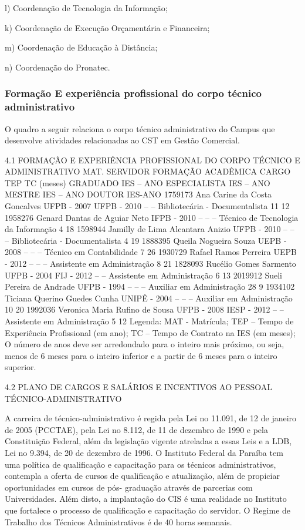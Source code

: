 l)      Coordena\c{c}\~ao de Tecnologia da Informa\c{c}\~ao;

k)      Coordena\c{c}\~ao de Execu\c{c}\~ao Or\c{c}ament\'aria e Financeira;

m)      Coordena\c{c}\~ao de Educa\c{c}\~ao \`a Dist\^ancia;

n)      Coordena\c{c}\~ao do Pronatec.


\subsubsection{Forma\c{c}\~ao E experi\^encia profissional do corpo t\'ecnico administrativo}

	



O quadro a seguir relaciona o corpo técnico administrativo do Campus que desenvolve atividades relacionadas ao CST em Gestão Comercial.
 

4.1 FORMAÇÃO E EXPERIÊNCIA PROFISSIONAL DO CORPO TÉCNICO E ADMINISTRATIVO
MAT.	SERVIDOR	FORMAÇÃO ACADÊMICA	CARGO	TEP	TC
(meses)
		GRADUADO
IES – ANO	ESPECIALISTA
IES – ANO	MESTRE
IES – ANO	DOUTOR
IES-ANO			
1759173	Ana Carine da Costa Goncalves	UFPB - 2007	UFPB - 2010	--	--	Bibliotecária - Documentalista	11	12
1958276	Genard Dantas de Aguiar Neto	IFPB - 2010	--	--	--	Técnico de Tecnologia da Informação	4	18
1598944	Jamilly de Lima Alcantara Anizio	UFPB - 2010	--	--	--	Bibliotecária - Documentalista	4	19
1888395	Queila Nogueira Souza	UEPB - 2008	--	--	--	Técnico em Contabilidade	7	26
1930729	Rafael Ramos Perreira	UEPB - 2012	--	--	--	Assistente em Administração	8	21
1828093	Rucélio Gomes Sarmento	UFPB - 2004	FIJ - 2012	--	--	Assistente em Administração	6	13
2019912	Sueli Pereira de Andrade	UFPB - 1994	--	--	--	Auxiliar em Administração	28	9
1934102	Ticiana Querino Guedes Cunha	UNIPÊ - 2004	--	--	--	Auxiliar em Administração	10	20
1992036	Veronica Maria Rufino de Sousa	UFPB - 2008	IESP - 2012	--	--	Assistente em Administração	5	12
Legenda:
MAT -  Matrícula;
TEP – Tempo de Experiência Profissional (em ano);
TC – Tempo de Contrato na IES (em meses);
O número de anos deve ser arredondado para o inteiro mais próximo, ou seja, menos de 6 meses para o inteiro inferior e a partir de 6 meses para o inteiro superior.

 
4.2 PLANO DE CARGOS E SALÁRIOS E INCENTIVOS AO PESSOAL TÉCNICO-ADMINISTRATIVO

A carreira de técnico-administrativo é regida pela Lei no 11.091, de 12 de janeiro de 2005 (PCCTAE), pela Lei no 8.112, de 11 de dezembro de 1990 e pela Constituição Federal, além da legislação vigente atreladas a essas Leis e a LDB, Lei no 9.394, de 20 de dezembro de 1996. 
O Instituto Federal da Paraíba tem uma política de qualificação e capacitação para os técnicos administrativos, contempla a oferta de cursos de qualificação e atualização, além de propiciar oportunidades em cursos de pós- graduação através de parcerias com Universidades. Além disto, a implantação do CIS é uma realidade no Instituto que fortalece o processo de qualificação e capacitação do servidor. O Regime de Trabalho dos Técnicos Administrativos é de 40 horas semanais.


